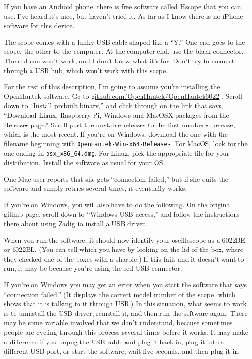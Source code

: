 If you have an Android phone, there is
free software called Hscope that you can use. I've heard it's nice, but haven't tried it.
As far as I know there is no iPhone software for this device.

The scope comes with a funky USB cable shaped like a ``Y.'' One end goes to the
scope, the other to the computer. At the computer end, use the black connector. The red
one won't work, and I don't know what it's for.
Don't try to connect through a USB hub, which won't work with this scope.

For the rest of this description, I'm going to assume you're installing the OpenHantek
software. Go to 
\url{github.com/OpenHantek/OpenHantek6022} . Scroll down to ``Install prebuilt binary,''
and click through on the link that says, ``Download Linux, Raspberry Pi, Windows and MacOSX packages from the Releases page.''
Scroll past the unstable releases to the first numbered release, which is the most recent.
If you're on Windows, download the one with the filename beginning with {\tt OpenHantek-Win-x64-Release-}.
For MacOS, look for the one ending in {\tt osx\_x86\_64.dmg}. For Linux, pick the appropriate file
for your distribution.
Install the software as usual for your OS.

One Mac user reports that she gets ``connection failed,'' but if she quits
the software and simply retries several times, it eventually works.

If you're on Windows, you will also have to do the following.
On the original github page, scroll down to
``Windows USB access,'' and follow the instructions there about using Zadig
to install a USB driver.

When you run the software, it should now identify your oscilloscope as a 6022BE or
6022BL. (You can tell which you have by looking on the lid of the box, where they
checked one of the boxes with a sharpie.) If this fails and it doesn't want to run,
it may be because you're using the red USB connector.

If you're on Windows you may get an error when you start the software that says
``connection failed.'' (It displays the correct model number of the scope, which shows
that it is talking to it through USB.) In this situation, what seems to work is to
uninstall the USB driver, reinstall it, and then run the software again. There may
be some variable involved that we don't understand, because sometimes people are
cycling through this process several times before it works. It may make a difference
if you unpug the USB cable and plug it back in, plug it into a different USB port,
or start the software, wait five seconds, and then plug it in.

